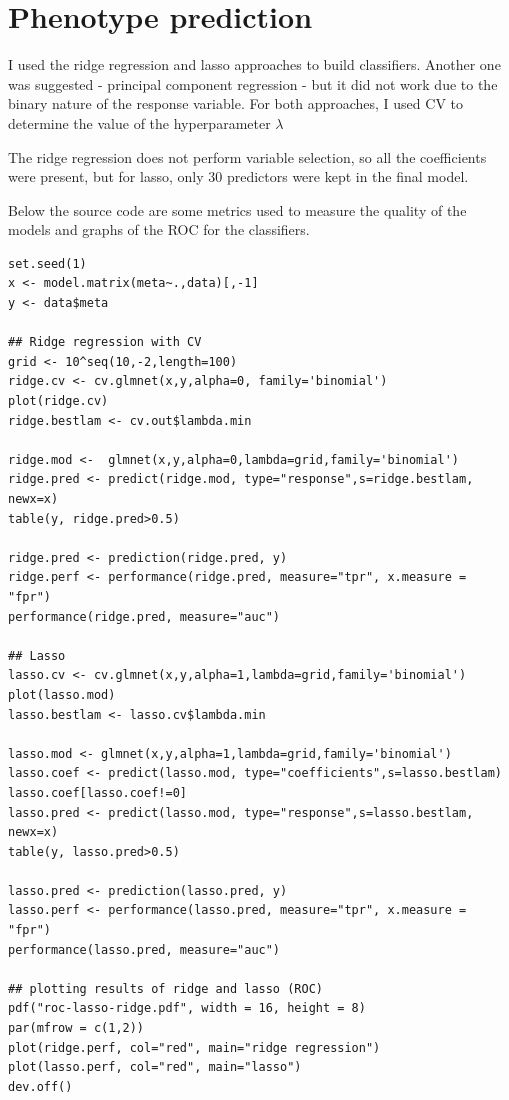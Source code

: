 \documentclass[11pt, a4paper]{article}
\begin{document}
\section{Phenotype prediction}
\label{sec-4}


I used the ridge regression and lasso approaches to build
classifiers. Another one was suggested - principal component
regression - but it did not work due to the binary nature of the
response variable. For both approaches, I used CV to determine the
value of the hyperparameter $\lambda$

The ridge regression does not perform variable selection, so all the
coefficients were present, but for lasso, only 30 predictors were kept
in the final model.

Below the source code are some metrics used to measure the quality of
the models and graphs of the ROC for the classifiers.


\begin{verbatim}
set.seed(1)
x <- model.matrix(meta~.,data)[,-1]
y <- data$meta

## Ridge regression with CV
grid <- 10^seq(10,-2,length=100)
ridge.cv <- cv.glmnet(x,y,alpha=0, family='binomial')
plot(ridge.cv)
ridge.bestlam <- cv.out$lambda.min

ridge.mod <-  glmnet(x,y,alpha=0,lambda=grid,family='binomial')
ridge.pred <- predict(ridge.mod, type="response",s=ridge.bestlam, newx=x)
table(y, ridge.pred>0.5)

ridge.pred <- prediction(ridge.pred, y)
ridge.perf <- performance(ridge.pred, measure="tpr", x.measure = "fpr")
performance(ridge.pred, measure="auc")

## Lasso
lasso.cv <- cv.glmnet(x,y,alpha=1,lambda=grid,family='binomial')
plot(lasso.mod)
lasso.bestlam <- lasso.cv$lambda.min

lasso.mod <- glmnet(x,y,alpha=1,lambda=grid,family='binomial')
lasso.coef <- predict(lasso.mod, type="coefficients",s=lasso.bestlam)
lasso.coef[lasso.coef!=0]
lasso.pred <- predict(lasso.mod, type="response",s=lasso.bestlam, newx=x)
table(y, lasso.pred>0.5)

lasso.pred <- prediction(lasso.pred, y)
lasso.perf <- performance(lasso.pred, measure="tpr", x.measure = "fpr")
performance(lasso.pred, measure="auc")

## plotting results of ridge and lasso (ROC)
pdf("roc-lasso-ridge.pdf", width = 16, height = 8)
par(mfrow = c(1,2))
plot(ridge.perf, col="red", main="ridge regression")
plot(lasso.perf, col="red", main="lasso")
dev.off()
\end{verbatim}
\end{document}
